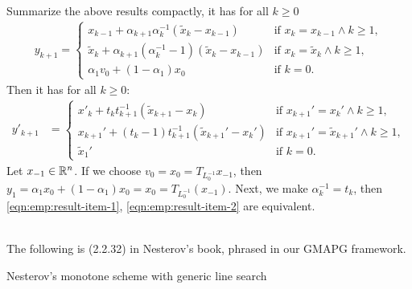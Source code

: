 \documentclass[12pt]{report}
\begin{document}
\begin{example}
            \par
            Summarize the above results compactly, it has for all $k \ge 0$
            \begin{align}\label{eqn:emp:result-item-1}
                y_{k + 1} = \begin{cases}
                    x_{k - 1} + \alpha_{k + 1}\alpha_k^{-1}(\tilde x_k - x_{k - 1})
                    & \text{if } x_k = x_{k - 1} \wedge k \ge 1,
                    \\
                    \tilde x_k + \alpha_{k + 1}(\alpha_k^{-1} - 1)(\tilde x_k - x_{k - 1})
                    & \text{if } x_k = \tilde x_k \wedge k \ge 1,
                    \\
                    \alpha_1v_0 + (1 - \alpha_1)x_0 & \text{if } k = 0. 
                \end{cases}
            \end{align}
            Then it has for all $k \ge 0$: 
            \begin{align}\label{eqn:emp:result-item-2}
                y'_{k + 1} &= 
                \begin{cases}
                    x'_k + t_kt_{k + 1}^{-1}(\tilde x_{k + 1} - x_k) 
                    & \text{if } x_{k + 1}' = x_k' \wedge k \ge 1,
                    \\
                    x_{k + 1}' + (t_k - 1)t_{k + 1}^{-1}(\tilde x_{k + 1}' - x_k')  
                    & \text{if } x_{k + 1}' = \tilde x_{k + 1}'\wedge k \ge 1, 
                    \\
                    \tilde x_1'
                    & 
                    \text{if } k = 0. 
                \end{cases}
            \end{align}
            Let $x_{-1} \in \mathbb R^n$. 
            If we choose $v_0 = x_0 = T_{L_0^{-1}} x_{-1}$, then $y_1 = \alpha_1 x_0 + (1 - \alpha_1)x_0 = x_0 = T_{L_0^{-1}}(x_{-1})$.
            Next, we make $\alpha_k^{-1} = t_k$, then \eqref{eqn:emp:result-item-1}, \eqref{eqn:emp:result-item-2} are equivalent. 
        \end{example}
        \begin{example}\;\\
            The following is (2.2.32) in Nesterov's book, phrased in our GMAPG framework. 
            \begin{algorithm}\label{alg:nesterov-mono-generic-ls}
            \begin{algorithmic}[1]
            \end{algorithmic}\caption{Nesterov's monotone scheme with generic line search}
            \end{algorithm}
        \end{example}
\end{document}
